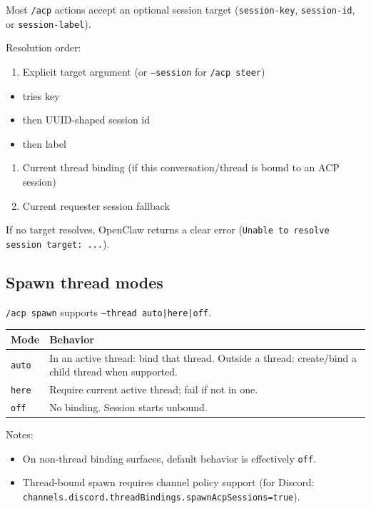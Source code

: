 Most \texttt{/acp} actions accept an optional session target (\texttt{session-key}, \texttt{session-id}, or \texttt{session-label}).

Resolution order:

\begin{enumerate}
  \item Explicit target argument (or \texttt{--session} for \texttt{/acp steer})
\end{enumerate}

\begin{itemize}
  \item tries key
  \item then UUID-shaped session id
  \item then label
\end{itemize}

\begin{enumerate}
  \item Current thread binding (if this conversation/thread is bound to an ACP session)
  \item Current requester session fallback
\end{enumerate}


If no target resolves, OpenClaw returns a clear error (\texttt{Unable to resolve session target: ...}).

\subsection{Spawn thread modes}


\texttt{/acp spawn} supports \texttt{--thread auto|here|off}.


\begin{table}[h]
\centering
\small
\begin{tabular}{|l|l|}
\hline
Mode & Behavior \\
\hline
\texttt{auto} & In an active thread: bind that thread. Outside a thread: create/bind a child thread when supported. \\
\hline
\texttt{here} & Require current active thread; fail if not in one. \\
\hline
\texttt{off} & No binding. Session starts unbound. \\
\hline
\end{tabular}
\end{table}



Notes:

\begin{itemize}
  \item On non-thread binding surfaces, default behavior is effectively \texttt{off}.
  \item Thread-bound spawn requires channel policy support (for Discord: \texttt{channels.discord.threadBindings.spawnAcpSessions=true}).
\end{itemize}


